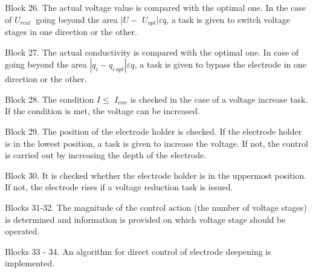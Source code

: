 \begin{noparindent}
Block 26. The actual voltage value is compared with the optimal one. In
the case of \(U_{real}\ \) going beyond the area \(|U -\)
\(U_{opt}|\varepsilon q\), a task is given to switch voltage stages in
one direction or the other.

Block 27. The actual conductivity is compared with the optimal one. In
case of going beyond the area
\(|q_{i} - q_{i\ opt}|\varepsilon q\)\emph{,} a task is given to bypass
the electrode in one direction or the other.

Block 28. The condition \(I \leq\) \(I_{con}\) is checked in the case of
a voltage increase task. If the condition is met, the voltage can be
increased.

Block 29. The position of the electrode holder is checked. If the
electrode holder is in the lowest position, a task is given to increase
the voltage. If not, the control is carried out by increasing the depth
of the electrode.

Block 30. It is checked whether the electrode holder is in the uppermost
position. If not, the electrode rises if a voltage reduction task is
issued.

Blocks 31-32. The magnitude of the control action (the number of voltage
stages) is determined and information is provided on which voltage stage
should be operated.

Blocks 33 - 34. An algorithm for direct control of electrode deepening
is implemented.
\end{noparindent}

